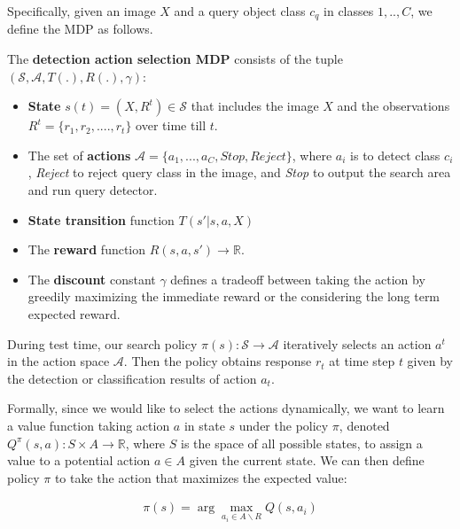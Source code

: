 Specifically, given an image $X$ and a query object class $c_q$ in classes ${1,..,C}$, we define the MDP as follows.
\begin{mydef}
 The \textbf{detection action selection MDP} consists of the tuple $(\mathcal{S}, \mathcal{A}, T(.), R(.), \gamma)$:
\begin{itemize}
\item \textbf{State} $s(t) = (X, R^t)\in \mathcal{S}$ that includes the image $X$ and the observations $R^t= \{r_1, r_2, ....,r_t\}$ over time till $t$.
\item The set of \textbf{actions} $\mathcal{A} = \{a_1, ..., a_C, Stop, Reject\} $, where $a_i$ is to detect class $c_i$, \textit{Reject} to reject query class in the image, and \textit{Stop} to output the search area and run query detector.
\item \textbf{State transition} function $T(s'|s,a, X)$
\item The \textbf{reward} function $R(s,a,s') \rightarrow \mathbb{R}$.
\item The \textbf{discount} constant $\gamma$ defines a tradeoff between taking the action by greedily maximizing the immediate reward or the considering the long term expected reward.
\end{itemize}
\end{mydef}

% 

During test time, our search policy $\pi(s): \mathcal{S} \rightarrow \mathcal{A}$ iteratively selects an action $a^t$ in the action space $\mathcal{A}$. %
Then the policy obtains response $r_t$ at time step $t$ given by the detection or classification results of action $a_t$. 

Formally, since we would like to select the actions dynamically, we want to learn a value function taking action $a$ in state $s$ under the policy $\pi$, denoted $Q^\pi(s,a): S\times A \rightarrow \mathbb{R}$, where $S$ is the space of all possible states, to assign a value to a potential action $a\in A$ given the current state. We can then define policy $\pi$ to take the action that maximizes the expected value:

\begin{eqnarray}
\label{eq:pi}
\pi(s) = \arg\max_{a_i\in A\backslash R} Q(s,a_i)
\end{eqnarray}

